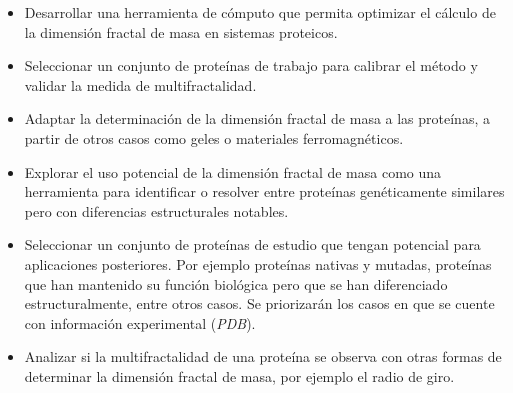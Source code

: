 \begin{itemize}

\item Desarrollar una herramienta de c\'{o}mputo que permita optimizar el c\'{a}lculo de la dimensi\'{o}n fractal de masa en sistemas proteicos.

\item Seleccionar un conjunto de proteínas de trabajo para calibrar el método y validar la medida de multifractalidad.

\item Adaptar la determinaci\'{o}n de la dimensi\'{o}n fractal de masa a las prote\'{i}nas, a partir de otros casos como geles o materiales ferromagn\'{e}ticos.

\item Explorar el uso potencial de la dimensi\'{o}n fractal de masa como una herramienta para identificar o resolver entre prote\'{i}nas gen\'{e}ticamente similares pero con diferencias estructurales notables.

\item Seleccionar un conjunto de prote\'{i}nas de estudio que tengan potencial para aplicaciones posteriores. Por ejemplo prote\'{i}nas nativas y mutadas, prote\'{i}nas que han mantenido su funci\'{o}n biol\'{o}gica pero que se han diferenciado estructuralmente, entre otros casos. Se priorizar\'{a}n los casos en que se cuente con informaci\'{o}n
experimental (\textit{PDB}).

\item Analizar si la multifractalidad de una prote\'{i}na se observa con otras formas de determinar la dimensi\'{o}n fractal de masa, por ejemplo el radio de giro.



\end{itemize}

\color{black}